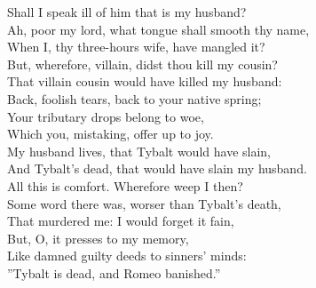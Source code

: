 \documentclass[10pt,a4paper]{article}
\begin{document}
\begin{drama*}
\julspeaks
Shall I speak ill of him that is my husband?\\
Ah, poor my lord, what tongue shall smooth thy name,\\
When I, thy three-hours wife, have mangled it?\\ 
But, wherefore, villain, didst thou kill my cousin?\\
That villain cousin would have killed my husband:\\
Back, foolish tears, back to your native spring;\\
Your tributary drops belong to woe,\\
Which you, mistaking, offer up to joy.\\ 
My husband lives, that Tybalt would have slain,\\
And Tybalt's dead, that would have slain my husband.\\
All this is comfort. Wherefore weep I then?\\
Some word there was, worser than Tybalt's death,\\
That murdered me: I would forget it fain,\\ 
But, O, it presses to my memory,\\
Like damned guilty deeds to sinners' minds:\\
”Tybalt is dead, and Romeo banished.”

\end{drama*}
\end{document}
